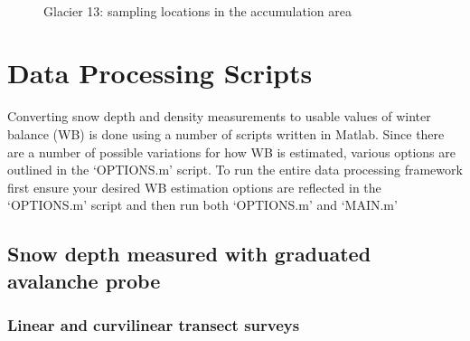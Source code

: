 \documentclass{sfuthesis}
\begin{document}
\begin{appendices}
\begin{figure}[H]
	\\
\caption[]{Glacier 13: sampling locations in the accumulation area}
\end{figure}


\chapter{Data Processing Scripts}
\label{app:DataProcessingScripts}

Converting snow depth and density measurements to usable values of winter balance (WB) is done using a number of scripts written in Matlab. Since there are a number of possible variations for how WB is estimated, various options are outlined in the `OPTIONS.m' script. To run the entire data processing framework first ensure your desired WB estimation options are reflected in the `OPTIONS.m' script and then run both `OPTIONS.m' and `MAIN.m'

\section{Snow depth measured with graduated avalanche probe}
\subsection{Linear and curvilinear transect surveys}


\end{appendices}
\end{document}
